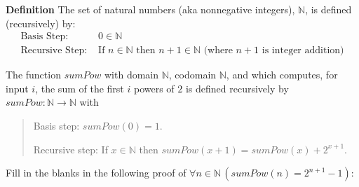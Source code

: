 \documentclass[12pt, oneside]{article}
\begin{document}

{\bf Definition} The set of natural numbers (aka nonnegative integers), $\mathbb{N}$, is defined (recursively) by:
\[
\begin{array}{ll}
\textrm{Basis Step: } & 0 \in \mathbb{N} \\
\textrm{Recursive Step: } & \textrm{If } n \in \mathbb{N} \textrm{ then } n+1 \in \mathbb{N} \textrm{ (where $n+1$ is integer addition)}
\end{array}
\]

The function $sumPow$ with domain $\mathbb{N}$, codomain
$\mathbb{N}$, and which computes, for input $i$, the sum of the first $i$ powers of $2$ is defined
recursively by $sumPow: \mathbb{N} \to \mathbb{N}$ with

\vspace{-20pt}

\begin{quote}
Basis step: $sumPow(0) = 1$.

Recursive step: If $x \in \mathbb{N}$ then $sumPow(x+1) = sumPow(x) + 2^{x+1}$.
\end{quote}

\vfill



Fill in the blanks in the following proof of $\forall n \in \mathbb{N} \, (sumPow(n) = 2^{n+1} - 1)$:

\vspace{-20pt}
\end{document}
